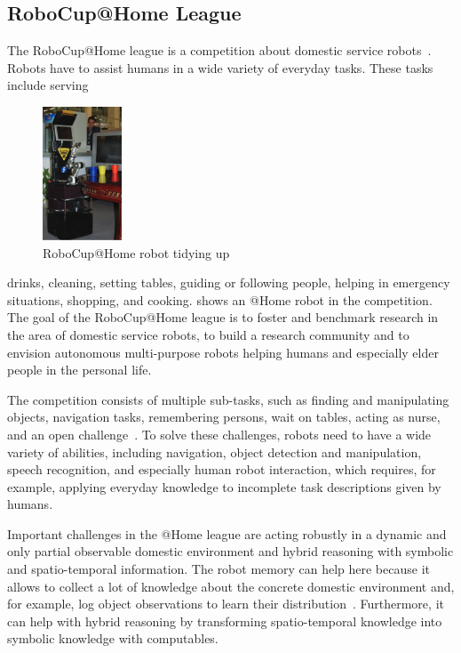 \subsection{RoboCup@Home League}
The RoboCup@Home league is a competition about domestic service
robots~\cite{wisspeintner2009robocup}. Robots have to assist
humans in a wide variety of everyday tasks. These tasks include
serving
\begin{figure}
  \centering
  \includegraphics[height=150px]{img/ceasar}%
  \caption{RoboCup@Home robot tidying up~\cite{wisspeintner2009robocup}}
  \vspace{-3mm}
  \label{fig:athome}
\end{figure}
drinks, cleaning, setting tables, guiding or following people,
helping in emergency situations, shopping, and cooking.
 shows an @Home robot in the
competition.
%
The goal of the RoboCup@Home league is to foster and benchmark
research in the area of domestic service robots, to build a research
community and to envision autonomous multi-purpose robots helping
humans and especially elder people in the personal life.

The competition consists of multiple sub-tasks,
such as finding and manipulating objects, navigation tasks,
remembering persons, wait on tables, acting as
nurse, and an open challenge~\cite{athome-rules}.
To solve these challenges, robots need to
have a wide variety of abilities, including navigation, object
detection and manipulation, speech recognition, and especially human
robot interaction, which requires, for example, applying everyday
knowledge to incomplete task descriptions given by humans.

Important challenges in the @Home league are acting robustly in a
dynamic and only partial observable domestic environment and hybrid
reasoning with symbolic and spatio-temporal information.
The robot memory can help here because it allows to collect a lot
of knowledge about the concrete domestic environment and, for example,
log object observations to learn their distribution~\cite{deebul}.
Furthermore, it can help with hybrid reasoning by transforming
spatio-temporal knowledge into symbolic knowledge with computables.
